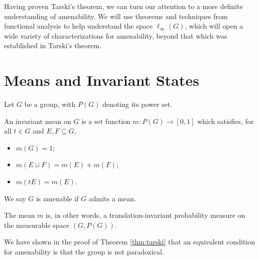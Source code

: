 Having proven Tarski's theorem, we can turn our attention to a more definite understanding of amenability. We will use theorems and techniques from functional analysis to help understand the space $\ell_{\infty}\left(G\right)$, which will open a wide variety of characterizations for amenability, beyond that which was established in Tarski's theorem.
\section{Means and Invariant States}%
\begin{definition}
  Let $G$ be a group, with $P(G)$ denoting its power set.\newline

  An invariant {mean} on $G$ is a set function $m\colon P(G)\rightarrow [0,1]$ which satisfies, for all $t\in G$ and $E,F\subseteq G$,
  \begin{itemize}
    \item $m(G) = 1$;
    \item $m\left(E\sqcup F\right) = m(E) + m(F)$;
    \item $m\left(tE\right) = m\left(E\right)$.
  \end{itemize}
  We say $G$ is amenable if $G$ admits a mean.\newline

  The mean $m$ is, in other words, a translation-invariant probability measure on the measurable space $\left(G,P(G)\right)$.
\end{definition}
We have shown in the proof of Theorem \ref{thm:tarski} that an equivalent condition for amenability is that the group is not paradoxical.\newline

